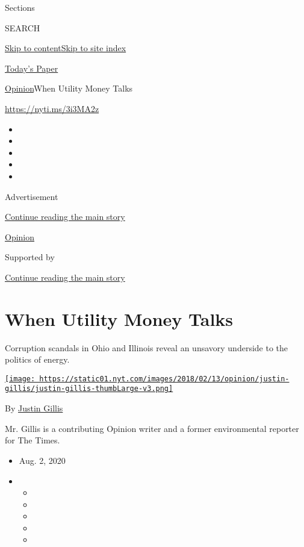 Sections

SEARCH

\protect\hyperlink{site-content}{Skip to
content}\protect\hyperlink{site-index}{Skip to site index}

\href{https://myaccount.nytimes.com/auth/login?response_type=cookie\&client_id=vi}{}

\href{https://www.nytimes.com/section/todayspaper}{Today's Paper}

\href{/section/opinion}{Opinion}\textbar{}When Utility Money Talks

\url{https://nyti.ms/3i3MA2z}

\begin{itemize}
\item
\item
\item
\item
\item
\end{itemize}

Advertisement

\protect\hyperlink{after-top}{Continue reading the main story}

\href{/section/opinion}{Opinion}

Supported by

\protect\hyperlink{after-sponsor}{Continue reading the main story}

\hypertarget{when-utility-money-talks}{%
\section{When Utility Money Talks}\label{when-utility-money-talks}}

Corruption scandals in Ohio and Illinois reveal an unsavory underside to
the politics of energy.

\href{https://www.nytimes.com/by/justin-gillis}{\texttt{[image: https://static01.nyt.com/images/2018/02/13/opinion/justin-gillis/justin-gillis-thumbLarge-v3.png]}}

By \href{https://www.nytimes.com/by/justin-gillis}{Justin Gillis}

Mr. Gillis is a contributing Opinion writer and a former environmental
reporter for The Times.

\begin{itemize}
\item
  Aug. 2, 2020
\item
  \begin{itemize}
  \item
  \item
  \item
  \item
  \item
  \end{itemize}
\end{itemize}

